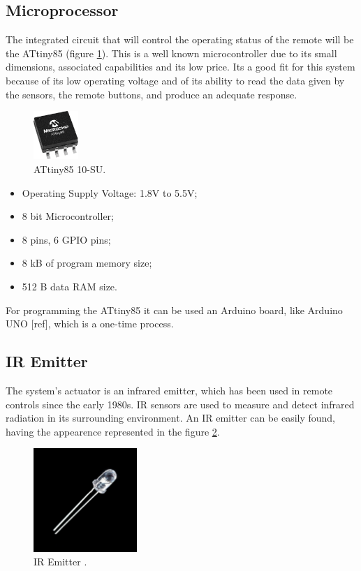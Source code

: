 \documentclass[12pt, letterpaper]{report}
\begin{document}
\subsection{Microprocessor}
The integrated circuit that will control the operating status of the remote will be the ATtiny85 \cite{microp} (figure \ref{fig:attiny}). This is a well known microcontroller due to its small dimensions, associated capabilities and its low price. Its a good fit for this system because of its low operating voltage and of its ability to read the data given by the sensors, the remote buttons, and produce an adequate response.

\begin{figure}[ht]
	\centering
	\includegraphics[width=0.15\textwidth]{attiny}
	\caption{ATtiny85 10-SU.}
	\label{fig:attiny}
\end{figure}

\begin{itemize}
	\item Operating Supply Voltage: 1.8V to 5.5V;
	\item 8 bit Microcontroller;
	\item 8 pins, 6 GPIO pins;
	\item 8 kB of program memory size;
	\item 512 B data RAM size.
\end{itemize}

For programming the ATtiny85 it can be used an Arduino board, like Arduino UNO [ref], which is a one-time process.

\subsection{IR Emitter}
The system’s actuator is an infrared emitter, which has been used in remote controls since the early 1980s. IR sensors are used to measure and detect infrared radiation in its surrounding environment. An IR emitter can be easily found, having the appearence represented in the figure \ref{fig:iremitter}.

\begin{figure}[ht]
	\centering
	\includegraphics[width=0.35\textwidth]{iremitter}
	\caption{IR Emitter \cite{ir}.}
	\label{fig:iremitter}
\end{figure}
\end{document}
